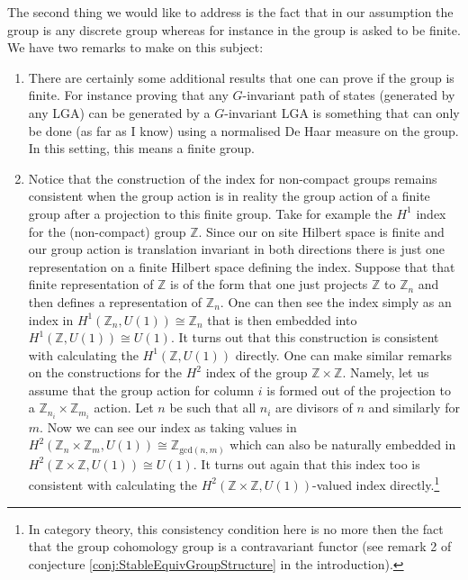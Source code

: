 \documentclass[12pt,a4paper,twoside]{article}
\newcommand{\ZZ}{\mathbb Z}
\theoremstyle{definition}
\numberwithin{equation}{section}
\begin{document}
The second thing we would like to address is the fact that in our assumption the group is any discrete group whereas for instance in \cite{ogata2021h3gmathbb} the group is asked to be finite. We have two remarks to make on this subject:
\begin{enumerate}
	\item There are certainly some additional results that one can prove if the group is finite. For instance proving that any $G$-invariant path of states (generated by any LGA) can be generated by a $G$-invariant LGA is something that can only be done (as far as I know) using a normalised De Haar measure on the group. In this setting, this means a finite group.
	\item Notice that the construction of the index for non-compact groups remains consistent when the group action is in reality the group action of a finite group after a projection to this finite group. Take for example the $H^1$ index for the (non-compact) group $\ZZ$. Since our on site Hilbert space is finite and our group action is translation invariant in both directions there is just one representation on a finite Hilbert space defining the index. Suppose that that finite representation of $\ZZ$ is of the form that one just projects $\ZZ$ to $\ZZ_n$ and then defines a representation of $\ZZ_n$. One can then see the index simply as an index in $H^1(\ZZ_n,U(1))\cong \ZZ_n$ that is then embedded into $H^1(\ZZ,U(1))\cong U(1)$. It turns out that this construction is consistent with calculating the $H^1(\ZZ,U(1))$ directly. One can make similar remarks on the constructions for the $H^2$ index of the group $\ZZ\times \ZZ$. Namely, let us assume that the group action for column $i$ is formed out of the projection to a $\ZZ_{n_i}\times\ZZ_{m_i}$ action. Let $n$ be such that all $n_i$ are divisors of $n$ and similarly for $m$. Now we can see our index as taking values in $H^2(\ZZ_n\times\ZZ_m,U(1))\cong \ZZ_{\text{gcd}(n,m)}$ which can also be naturally embedded in $H^2(\ZZ\times \ZZ,U(1))\cong U(1)$. It turns out again that this index too is consistent with calculating the $H^2(\ZZ\times \ZZ,U(1))$-valued index directly.\footnote{In category theory, this consistency condition here is no more then the fact that the group cohomology group is a contravariant functor (see remark 2 of conjecture \ref{conj:StableEquivGroupStructure} in the introduction).}
\end{enumerate}
\end{document}
